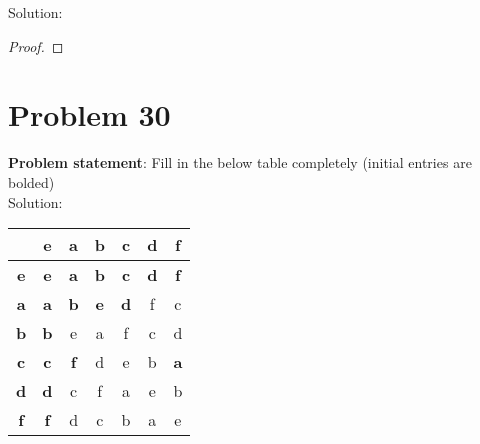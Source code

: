 \documentclass{article} %
\begin{document}
Solution: 
\begin{addmargin}[1em]{0em}
\begin{proof}

\end{proof}
\end{addmargin}

\newpage

\section*{Problem 30}


\textbf{Problem statement}: Fill in the below table completely (initial entries are bolded)
\\

Solution: 
\begin{addmargin}[1em]{0em}
\begin{tabular} {c | c c c c c c}
                  & \textbf{e} & \textbf{a} & \textbf{b} & \textbf{c} & \textbf{d} & \textbf{f} \\ \hline
\textbf{e} & \textbf{e} & \textbf{a} & \textbf{b} & \textbf{c} & \textbf{d} & \textbf{f} \\
\textbf{a} & \textbf{a} & \textbf{b} & \textbf{e} & \textbf{d} &        f         &        c       \\
\textbf{b} & \textbf{b} &         e         &       a          &         f         &        c          &       d       \\
\textbf{c} & \textbf{c} & \textbf{f}  &        d          &         e         &        b          & \textbf{a} \\
\textbf{d} & \textbf{d} &          c        &       f          &          a        &         e         &       b         \\
\textbf{f} & \textbf{f} &          d        &        c         &            b      &           a       &       e        \\
\end{tabular}
\end{addmargin}

\newpage
\end{document}
